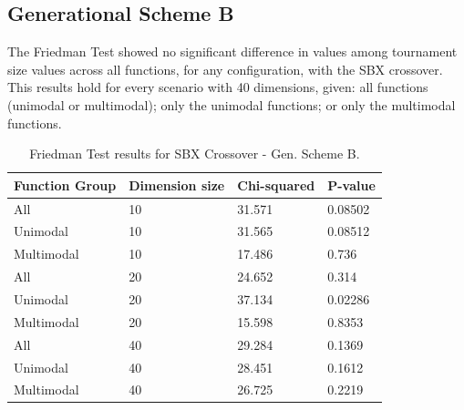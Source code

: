 \subsection{Generational Scheme B}


The Friedman Test showed no significant difference in values among tournament size values across all functions, for any configuration, with the SBX crossover. This results hold for every scenario with 40 dimensions, given: all functions (unimodal or multimodal); only the unimodal functions; or only the multimodal functions. 

\begin{table}[h]
	\centering
	\begin{tabular}{|l|l|l|l|}
		\hline
		\textbf{Function Group} & \textbf{Dimension size}      & \textbf{Chi-squared}        & \textbf{P-value}                     \\ \hline
		\multicolumn{1}{|l|}{All} & \multicolumn{1}{|l|}{10} & \multicolumn{1}{l|}{31.571} & \multicolumn{1}{l|}{0.08502} \\ \hline
		\multicolumn{1}{|l|}{Unimodal} & \multicolumn{1}{|l|}{10} & \multicolumn{1}{l|}{31.565} & \multicolumn{1}{l|}{0.08512} \\ \hline
		\multicolumn{1}{|l|}{Multimodal} & \multicolumn{1}{|l|}{10} & \multicolumn{1}{l|}{17.486} & \multicolumn{1}{l|}{0.736}  \\ \hline
		\hline
		\multicolumn{1}{|l|}{All} & \multicolumn{1}{|l|}{20} & \multicolumn{1}{l|}{24.652} & \multicolumn{1}{l|}{0.314} \\ \hline
		\multicolumn{1}{|l|}{Unimodal} & \multicolumn{1}{|l|}{20} & \multicolumn{1}{l|}{37.134} & \multicolumn{1}{l|}{0.02286} \\ \hline
		\multicolumn{1}{|l|}{Multimodal} & \multicolumn{1}{|l|}{20} & \multicolumn{1}{l|}{15.598} & \multicolumn{1}{l|}{0.8353}  \\ \hline
		\hline	
		\multicolumn{1}{|l|}{All} & \multicolumn{1}{|l|}{40} & \multicolumn{1}{l|}{29.284} & \multicolumn{1}{l|}{0.1369} 						\\ \hline
		\multicolumn{1}{|l|}{Unimodal} & \multicolumn{1}{|l|}{40} & \multicolumn{1}{l|}{28.451} & \multicolumn{1}{l|}{0.1612} \\ \hline
		\multicolumn{1}{|l|}{Multimodal} & \multicolumn{1}{|l|}{40} & \multicolumn{1}{l|}{26.725} & \multicolumn{1}{l|}{0.2219}  \\ \hline
	\end{tabular}
	\caption{Friedman Test results for SBX Crossover - Gen. Scheme B.}
	\label{Friedman_test_uniform-B}	
\end{table}

